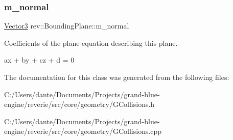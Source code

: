 \subsubsection{\texorpdfstring{m\_normal}{m\_normal}}
{\footnotesize\ttfamily \mbox{\hyperlink{classrev_1_1_vector}{Vector3}} rev\+::\+Bounding\+Plane\+::m\+\_\+normal\hspace{0.3cm}{\ttfamily [protected]}}



Coefficients of the plane equation describing this plane. 

ax + by + cz + d = 0 

The documentation for this class was generated from the following files\+:\begin{DoxyCompactItemize}
\item 
C\+:/\+Users/dante/\+Documents/\+Projects/grand-\/blue-\/engine/reverie/src/core/geometry/G\+Collisions.\+h\item 
C\+:/\+Users/dante/\+Documents/\+Projects/grand-\/blue-\/engine/reverie/src/core/geometry/G\+Collisions.\+cpp\end{DoxyCompactItemize}
